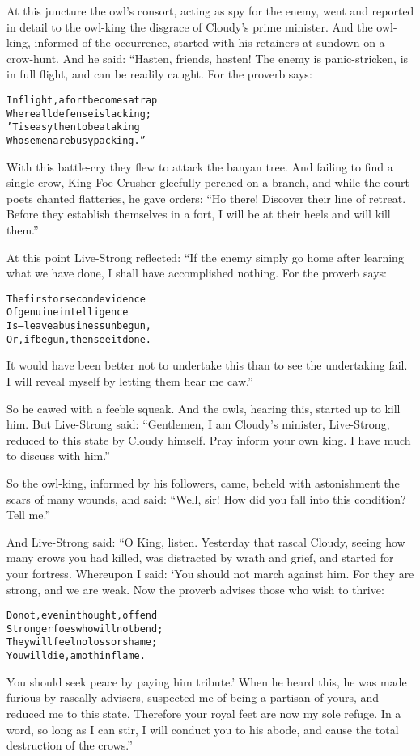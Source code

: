 \documentclass{article}
\renewenvironment{verbatim}{\begin{alltt}\normalfont\begin{centering}}{\end{centering}\end{alltt}}
\begin{document}
At this juncture the owl's consort, acting as spy for the enemy,
went and reported in detail to the owl-king the disgrace of
Cloudy's prime minister. And the owl-king, informed of the
occurrence, started with his retainers at sundown on a crow-hunt.
And he said: “Hasten, friends, hasten! The enemy is panic-stricken,
is in full flight, and can be readily caught. For the proverb
says:

\begin{verbatim}
In flight, a fort becomes a trap
    Where all defense is lacking;
'Tis easy then to beat a king
    Whose men are busy packing.”
\end{verbatim}
With this battle-cry they flew to attack the banyan tree. And
failing to find a single crow, King Foe-Crusher gleefully perched
on a branch, and while the court poets chanted flatteries, he gave
orders:
``Ho there! Discover their line of retreat. Before they establish themselves in a fort, I will be at their heels and will kill them.''

At this point Live-Strong reflected: “If the enemy simply go home
after learning what we have done, I shall have accomplished
nothing. For the proverb says:

\begin{verbatim}
The first or second evidence
Of genuine intelligence
Is--leave a business unbegun,
Or, if begun, then see it done.
\end{verbatim}
It would have been better not to undertake this than to see the
undertaking fail. I will reveal myself by letting them hear me
caw.”

So he cawed with a feeble squeak. And the owls, hearing this,
started up to kill him. But Live-Strong said:
``Gentlemen, I am Cloudy's minister, Live-Strong, reduced to this state by Cloudy himself. Pray inform your own king. I have much to discuss with him.''

So the owl-king, informed by his followers, came, beheld with
astonishment the scars of many wounds, and said:
``Well, sir! How did you fall into this condition? Tell me.''

And Live-Strong said: “O King, listen. Yesterday that rascal
Cloudy, seeing how many crows you had killed, was distracted by
wrath and grief, and started for your fortress. Whereupon I said:
‘You should not march against him. For they are strong, and we are
weak. Now the proverb advises those who wish to thrive:

\begin{verbatim}
Do not, even in thought, offend
Stronger foes who will not bend;
They will feel no loss or shame;
You will die, a moth in flame.
\end{verbatim}
You should seek peace by paying him tribute.' When he heard this,
he was made furious by rascally advisers, suspected me of being a
partisan of yours, and reduced me to this state. Therefore your
royal feet are now my sole refuge. In a word, so long as I can
stir, I will conduct you to his abode, and cause the total
destruction of the crows.”
\end{document}
